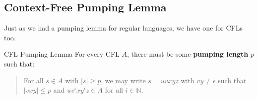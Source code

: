 \subsection{Context-Free Pumping Lemma}

Just as we had a pumping lemma for regular languages,
we have one for CFLs too.

\begin{theorem}{CFL Pumping Lemma}
    For every CFL $A$,
    there must be some \textbf{pumping length} $p$ such that:
    \begin{quote}
        For all $s \in A$ with $|s| \geq p$,
        we may write $s = uvxyz$ with $vy \neq \epsilon$
        such that $|vxy| \leq p$ and
        $uv^ixy^iz \in A$ for all $i \in \mathbb{N}$.
    \end{quote}
\end{theorem}

